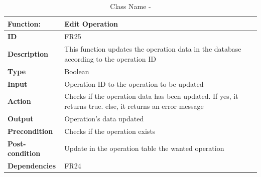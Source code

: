 \documentclass[]{article}
\begin{document}
\FloatBarrier
\begin{table}[h]
\caption{Class Name - }
\label{tab:my-table}
\begin{tabular}{|p{}|p{}|}
\hline
\textbf{Function:} & Edit Operation
\\ \hline
\textbf{ID}  &  FR25

\\ \hline
\textbf{Description}    &   This function updates the operation data in the database according to the operation ID                                                                  
\\ \hline
\textbf{Type}    &  Boolean       

\\ \hline
\textbf{Input}        & Operation ID to the operation to be updated


\\ \hline
\textbf{Action}            & Checks if the operation data has been updated. If yes, it returns true. else, it returns an error message 

\\ \hline
\textbf{Output}            & Operation's data updated

\\ \hline
\textbf{Precondition}           & Checks if the operation exists  

\\ \hline
\textbf{Post-condition}           & Update in the operation table the wanted operation


\\ \hline
\textbf{Dependencies}           & FR24
\\ \hline
\end{tabular}
\end{table}
\end{document}
